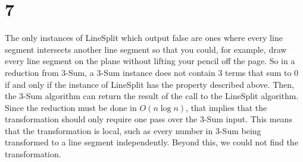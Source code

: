 \documentclass[letterpaper,notitlepage,twoside]{article}
\begin{document}
\section*{7}
The only instances of LineSplit which output false are ones where every line segment intersects another line segment so that you could, for example, draw every line segment on the plane without lifting your pencil off the page. So in a reduction from 3-Sum, a 3-Sum instance does not contain 3 terms that sum to 0 if and only if the instance of LineSplit has the property described above. Then, the 3-Sum algorithm can return the result of the call to the LineSplit algorithm. Since the reduction must be done in $O(n \log n)$, that implies that the transformation should only require one pass over the 3-Sum input. This means that the transformation is local, such as every number in 3-Sum being transformed to a line segment independently. Beyond this, we could not find the transformation.
\end{document}
